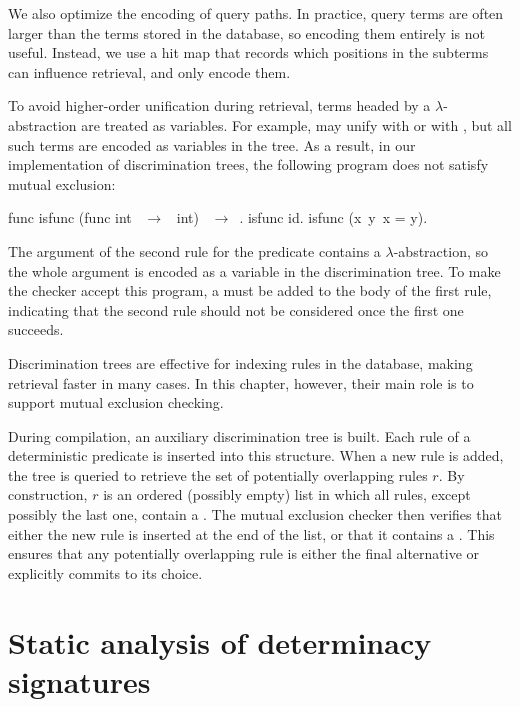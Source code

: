 We also optimize the encoding of query paths. In practice, query terms are often
larger than the terms stored in the database, so encoding them entirely is not
useful. Instead, we use a hit map that records which positions in the subterms
can influence retrieval, and only encode them.

To avoid higher-order unification during retrieval, terms headed by a
$\lambda$-abstraction are treated as variables. For example,  may
unify with  or with , but all such terms are encoded as
variables in the tree. As a result, in our implementation of discrimination
trees, the following program does not satisfy mutual exclusion:

\begin{elpicode}
func isfunc (func int ~$\to$~ int) ~$\to$~.
isfunc id.
isfunc (x\ y\ x = y).
\end{elpicode}

The argument of the second rule for the predicate  contains a
$\lambda$-abstraction, so the whole argument is encoded as a variable in the
discrimination tree. To make the checker accept this program, a \cut must be
added to the body of the first rule, indicating that the second rule should not
be considered once the first one succeeds.

Discrimination trees are effective for indexing rules in the \elpi database,
making retrieval faster in many cases. In this chapter, however, their main role is
to support mutual exclusion checking.

During compilation, an auxiliary discrimination tree is built. Each rule of a
deterministic predicate is inserted into this structure. When a new rule is
added, the tree is queried to retrieve the set of potentially overlapping rules
$r$. By construction, $r$ is an ordered (possibly empty) list in which all rules,
except possibly the last one, contain a \cut. The mutual exclusion checker then
verifies that either the new rule is inserted at the end of the list, or that it
contains a \cut. This ensures that any potentially overlapping rule is either
the final alternative or explicitly commits to its choice.


\section{Static analysis of determinacy signatures}
\label{sec:basic}
\label{sec:staticanalysis}


